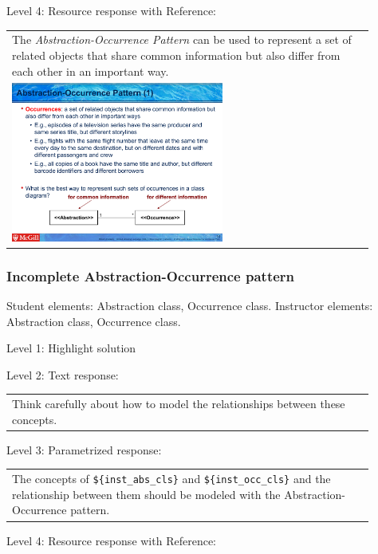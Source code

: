 \noindent Level 4: Resource response with Reference: \medskip

\begin{tabular}{|p{0.9\linewidth}}
The \textit{Abstraction-Occurrence Pattern} can be used to 
represent a set of related objects that share common information but also differ
from each other in an important way.

\\
\includegraphics[width=0.6\textwidth]{images/abstraction_occurrence.png}
\end{tabular} \medskip


\subsubsection{Incomplete Abstraction-Occurrence pattern}

Student elements: Abstraction class, Occurrence class. Instructor elements: Abstraction class, Occurrence class. \medskip

\noindent Level 1: Highlight solution  \medskip

\noindent Level 2: Text response: \medskip

\begin{tabular}{|p{0.9\linewidth}}
Think carefully about how to model the relationships between these concepts.
\end{tabular} \medskip

\noindent Level 3: Parametrized response: \medskip

\begin{tabular}{|p{0.9\linewidth}}
The concepts of \verb|${inst_abs_cls}| and \verb|${inst_occ_cls}| and the relationship between them should be modeled with the Abstraction-Occurrence pattern.
\end{tabular} \medskip

\noindent Level 4: Resource response with Reference: \medskip

